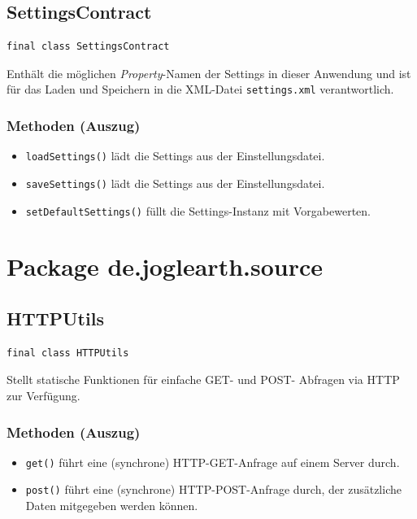 \documentclass[10pt]{scrreprt}
\begin{document}
\vspace{5mm}
\subsection*{SettingsContract}
\begin{lstlisting}
final class SettingsContract
\end{lstlisting}
Enthält die möglichen \textit{Property}-Namen der Settings in dieser Anwendung und ist für das Laden und Speichern in die XML-Datei \texttt{settings.xml} verantwortlich.\\
\subsubsection*{Methoden (Auszug)}
\begin{itemize}
\item \texttt{loadSettings()} lädt die Settings aus der Einstellungsdatei.
\item \texttt{saveSettings()} lädt die Settings aus der Einstellungsdatei.
\item \texttt{setDefaultSettings()} füllt die Settings-Instanz mit Vorgabewerten.
\end{itemize}



\pagebreak
\section{Package de.joglearth.source}
\subsection*{HTTPUtils}
\begin{lstlisting}
final class HTTPUtils
\end{lstlisting}
Stellt statische Funktionen für einfache GET- und POST- Abfragen via HTTP zur Verfügung.\\
\subsubsection*{Methoden (Auszug)}
\begin{itemize}
\item \texttt{get()} führt eine (synchrone) HTTP-GET-Anfrage auf einem Server durch.
\item \texttt{post()} führt eine (synchrone) HTTP-POST-Anfrage durch, der zusätzliche Daten mitgegeben werden können.
\end{itemize}
\end{document}

